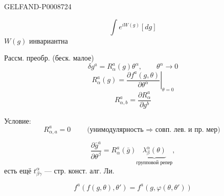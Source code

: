 \begin{GelfandAdjacentEvidence}{GELFAND-P000872}{4}

\begin{equation*}
\int e^{iW(g)}[dg]
\tag{12}
\end{equation*}
$W(g)$ инвариантна

Рассм. преобр. (беск. малое)
\begin{equation*}
\delta g^a=R_\alpha^a(g)\theta^\alpha,\qquad\theta^\alpha\to0
\tag{13}
\end{equation*}
\begin{equation*}
R_\alpha^a(g)=\left.\frac{\partial f^a(g,\theta)}{\partial\theta^\alpha}\right|_{\theta=0}
\tag{14}
\end{equation*}
\begin{equation*}
R_{\alpha,b}^a=\frac{\partial R_\alpha^a}{\partial g^b}
\tag{15}
\end{equation*}
\end{GelfandAdjacentEvidence}


Условие:
\begin{equation*}
R_{\alpha,a}^a=0
\qquad\text{(унимодулярность $\Rightarrow$ совп. лев. и пр. мер)}
\tag{16}
\end{equation*}

\begin{equation*}
\frac{\partial\bar g^a}{\partial\theta^\beta}
=R_\alpha^a(\bar g)\underbrace{\lambda_\beta^\alpha(\theta)}_{\text{групповой репер}},
\tag{17}
\end{equation*}
есть ещё $t_{\beta\gamma}^\alpha$ --- стр. конст. алг. Ли.

\begin{equation*}
f^a(f(g,\theta),\theta')=f^a(g,\varphi(\theta,\theta'))
\tag{18}
\end{equation*}



